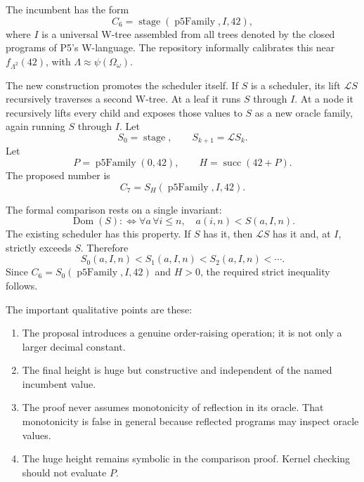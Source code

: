 \documentclass[11pt]{article}
\theoremstyle{definition}
\theoremstyle{remark}
\newcommand{\Lift}{\mathcal L}
\newcommand{\Idx}{I}
\newcommand{\Pfive}{P}
\newcommand{\Height}{H}
\begin{document}
The incumbent has the form
\begin{equation}\label{eq:c6}
 C_6=\operatorname{stage}(\operatorname{p5Family},\Idx,42),
\end{equation}
where \(\Idx\) is a universal W-tree assembled from all trees denoted by the
closed programs of P5's W-language.  The repository informally calibrates this
near \(f_{\Lambda^2}(42)\), with
\(\Lambda\approx\psi(\Omega_\omega)\).

The new construction promotes the scheduler itself.  If \(S\) is a scheduler,
its lift \(\Lift S\) recursively traverses a second W-tree.  At a leaf it runs
\(S\) through \(\Idx\).  At a node it recursively lifts every child and exposes
those values to \(S\) as a new oracle family, again running \(S\) through
\(\Idx\).  Let
\[
 S_0=\operatorname{stage},\qquad S_{k+1}=\Lift S_k.
\]
Let
\[
 \Pfive=\operatorname{p5Family}(0,42),\qquad
 \Height=\operatorname{succ}(42+\Pfive).
\]
The proposed number is
\begin{equation}\label{eq:c7}
 C_7=S_{\Height}(\operatorname{p5Family},\Idx,42).
\end{equation}

The formal comparison rests on a single invariant:
\[
 \operatorname{Dom}(S):\iff
 \forall a\,\forall i\le n,
 \quad a(i,n)<S(a,\Idx,n).
\]
The existing scheduler has this property.  If \(S\) has it, then
\(\Lift S\) has it and, at \(\Idx\), strictly exceeds \(S\).  Therefore
\[
 S_0(a,\Idx,n)<S_1(a,\Idx,n)<S_2(a,\Idx,n)<\cdots.
\]
Since \(C_6=S_0(\operatorname{p5Family},\Idx,42)\) and \(\Height>0\), the
required strict inequality follows.

The important qualitative points are these:
\begin{enumerate}[leftmargin=*,itemsep=0.25em]
\item The proposal introduces a genuine order-raising operation; it is not only
      a larger decimal constant.
\item The final height is huge but constructive and independent of the named
      incumbent value.
\item The proof never assumes monotonicity of reflection in its oracle.  That
      monotonicity is false in general because reflected programs may inspect
      oracle values.
\item The huge height remains symbolic in the comparison proof.  Kernel
      checking should not evaluate \(\Pfive\).
\end{enumerate}

\end{document}
